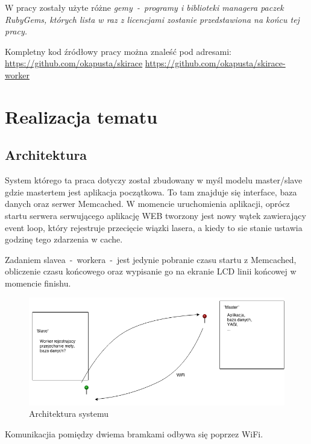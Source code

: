 \documentclass[11pt,a4paper, twoside]{article}
\begin{document}
\noindent
W pracy zostały użyte różne \em{gemy}~-~programy i biblioteki managera paczek \emph{RubyGems}, których lista w raz z licencjami zostanie przedstawiona na końcu tej pracy.
\newline

\noindent
Kompletny kod źródłowy pracy można znaleść pod adresami:
\newline
\url{https://github.com/okapusta/skirace}
\newline
\url{https://github.com/okapusta/skirace-worker}

\newpage

\newpage
\noindent
\section{Realizacja tematu}
\subsection{Architektura}
System którego ta praca dotyczy został zbudowany w myśl modelu master/slave gdzie mastertem jest aplikacja początkowa. To tam znajduje się interface, baza danych oraz serwer Memcached. W momencie uruchomienia aplikacji, oprócz startu serwera serwującego aplikację WEB tworzony jest nowy wątek zawierający event loop, który rejestruje przecięcie wiązki lasera, a kiedy to sie stanie ustawia godzinę tego zdarzenia w cache.

Zadaniem slavea~-~workera~-~jest jedynie pobranie czasu startu z Memcached, obliczenie czasu końcowego oraz wypisanie go na ekranie LCD linii końcowej w momencie finishu.
\newline

\begin{figure}[ht]
\includegraphics[scale=0.5]{./img/asdasd.png}
\caption{Architektura systemu}
\end{figure}
\noindent
Komunikacjia pomiędzy dwiema bramkami odbywa się poprzez WiFi.
\end{document}

